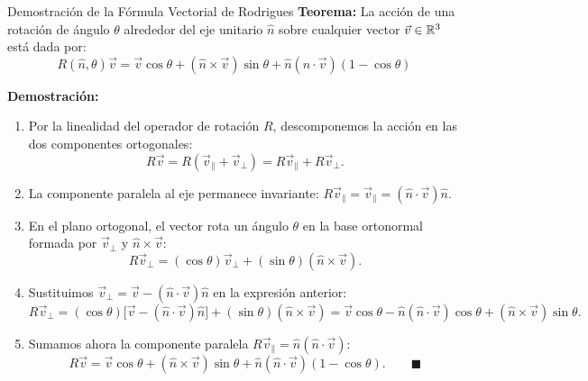 \documentclass[10pt,aspectratio=169]{beamer}
\begin{document}
\begin{frame}{Demostración de la Fórmula Vectorial de Rodrigues}
  \footnotesize
  \textbf{Teorema:} La acción de una rotación de ángulo $\theta$ alrededor del eje unitario $\hat{n}$ sobre cualquier vector $\vec{v} \in \mathbb{R}^3$ está dada por:
  \[
  \boxed{R(\hat{n}, \theta)\vec{v} = \vec{v}\cos\theta + (\hat{n}\times\vec{v})\sin\theta + \hat{n}(\hat{n}\cdot\vec{v})(1 - \cos\theta)}
  \]

  \textbf{Demostración:}
  \begin{enumerate}\itemsep4pt
    \item Por la linealidad del operador de rotación $R$, descomponemos la acción en las dos componentes ortogonales:
    \[
    R\vec{v} = R(\vec{v}_\parallel + \vec{v}_\perp) = R\vec{v}_\parallel + R\vec{v}_\perp.
    \]
    \item La componente paralela al eje permanece invariante: $R\vec{v}_\parallel = \vec{v}_\parallel = (\hat{n}\cdot\vec{v})\hat{n}$.
    \item En el plano ortogonal, el vector rota un ángulo $\theta$ en la base ortonormal formada por $\vec{v}_\perp$ y $\hat{n}\times\vec{v}$:
    \[
    R\vec{v}_\perp = (\cos\theta)\vec{v}_\perp + (\sin\theta)(\hat{n}\times\vec{v}).
    \]
    \item Sustituimos $\vec{v}_\perp = \vec{v} - (\hat{n}\cdot\vec{v})\hat{n}$ en la expresión anterior:
    \[
    R\vec{v}_\perp = (\cos\theta)\big[\vec{v} - (\hat{n}\cdot\vec{v})\hat{n}\big] + (\sin\theta)(\hat{n}\times\vec{v}) = \vec{v}\cos\theta - \hat{n}(\hat{n}\cdot\vec{v})\cos\theta + (\hat{n}\times\vec{v})\sin\theta.
    \]
    \item Sumamos ahora la componente paralela $R\vec{v}_\parallel = \hat{n}(\hat{n}\cdot\vec{v})$:
    \[
    R\vec{v} = \vec{v}\cos\theta + (\hat{n}\times\vec{v})\sin\theta + \hat{n}(\hat{n}\cdot\vec{v})(1 - \cos\theta). \qquad \blacksquare
    \]
  \end{enumerate}
\end{frame}
\end{document}
